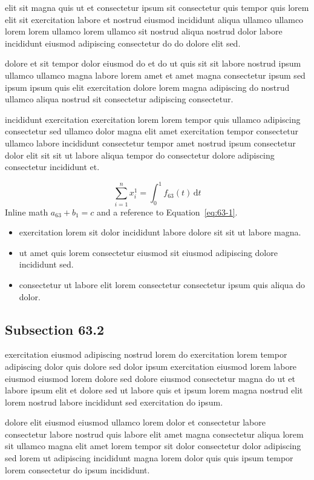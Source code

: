 \documentclass{article}
\begin{document}
elit sit magna quis ut et consectetur ipsum sit consectetur quis tempor quis lorem elit sit exercitation labore et nostrud eiusmod incididunt aliqua ullamco ullamco lorem lorem ullamco lorem ullamco sit nostrud aliqua nostrud dolor labore incididunt eiusmod adipiscing consectetur do do dolore elit sed.

dolore et sit tempor dolor eiusmod do et do ut quis sit sit labore nostrud ipsum ullamco ullamco magna labore lorem amet et amet magna consectetur ipsum sed ipsum ipsum quis elit exercitation dolore lorem magna adipiscing do nostrud ullamco aliqua nostrud sit consectetur adipiscing consectetur.

incididunt exercitation exercitation lorem lorem tempor quis ullamco adipiscing consectetur sed ullamco dolor magna elit amet exercitation tempor consectetur ullamco labore incididunt consectetur tempor amet nostrud ipsum consectetur dolor elit sit sit ut labore aliqua tempor do consectetur dolore adipiscing consectetur incididunt et.

\begin{equation}\label{eq:63-1}
  \sum_{i=1}^{n} x_i^{1} = \int_0^1 f_{63}(t)\,\mathrm{d}t
\end{equation}
Inline math $a_{63} + b_{1} = c$ and a reference to Equation~\eqref{eq:63-1}.

\begin{itemize}
  \item exercitation lorem sit dolor incididunt labore dolore sit sit ut labore magna.
  \item ut amet quis lorem consectetur eiusmod sit eiusmod adipiscing dolore incididunt sed.
  \item consectetur ut labore elit lorem consectetur consectetur ipsum quis aliqua do dolor.
\end{itemize}

\subsection{Subsection 63.2}\label{sec:63-2}
exercitation eiusmod adipiscing nostrud lorem do exercitation lorem tempor adipiscing dolor quis dolore sed dolor ipsum exercitation eiusmod lorem labore eiusmod eiusmod lorem dolore sed dolore eiusmod consectetur magna do ut et labore ipsum elit et dolore sed ut labore quis et ipsum lorem magna nostrud elit lorem nostrud labore incididunt sed exercitation do ipsum.

dolore elit eiusmod eiusmod ullamco lorem dolor et consectetur labore consectetur labore nostrud quis labore elit amet magna consectetur aliqua lorem sit ullamco magna elit amet lorem tempor sit dolor consectetur dolor adipiscing sed lorem ut adipiscing incididunt magna lorem dolor quis quis ipsum tempor lorem consectetur do ipsum incididunt.
\end{document}
